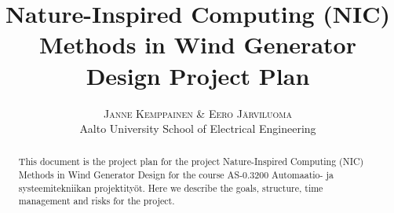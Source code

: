 \documentclass[twoside]{article}
\title{\vspace{-15mm}\fontsize{24pt}{10pt}\selectfont\textbf{Nature-Inspired Computing (NIC) Methods in Wind Generator Design Project Plan}} %
\author{
\large
\textsc{Janne Kemppainen \& Eero J\"arviluoma}\\[2mm] %
\normalsize Aalto University School of Electrical Engineering \\ %
\vspace{-5mm}
}
\date{}
\begin{document}
\maketitle %

\thispagestyle{fancy} %


\begin{abstract}

\noindent This document is the project plan for the project Nature-Inspired Computing (NIC) Methods in Wind Generator Design for the course AS-0.3200 Automaatio- ja systeemitekniikan projektity\"ot. Here we describe the goals, structure, time management and risks for the project.

\end{abstract}

\end{document}
